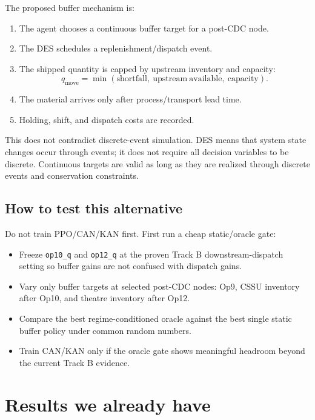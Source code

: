 \documentclass[11pt]{article}
\begin{document}
The proposed buffer mechanism is:

\begin{enumerate}[leftmargin=1.5em]
  \item The agent chooses a continuous buffer target for a post-CDC node.
  \item The DES schedules a replenishment/dispatch event.
  \item The shipped quantity is capped by upstream inventory and capacity:
  \[
    q_{\mathrm{move}} =
    \min(\mathrm{shortfall},\ \mathrm{upstream\ available},\ \mathrm{capacity}).
  \]
  \item The material arrives only after process/transport lead time.
  \item Holding, shift, and dispatch costs are recorded.
\end{enumerate}

This does not contradict discrete-event simulation. DES means that system state
changes occur through events; it does not require all decision variables to be
discrete. Continuous targets are valid as long as they are realized through
discrete events and conservation constraints.

\subsection*{How to test this alternative}

Do not train PPO/CAN/KAN first. First run a cheap static/oracle gate:

\begin{itemize}[leftmargin=1.5em]
  \item Freeze \texttt{op10\_q} and \texttt{op12\_q} at the proven Track B
  downstream-dispatch setting so buffer gains are not confused with dispatch
  gains.
  \item Vary only buffer targets at selected post-CDC nodes: Op9, CSSU inventory
  after Op10, and theatre inventory after Op12.
  \item Compare the best regime-conditioned oracle against the best single
  static buffer policy under common random numbers.
  \item Train CAN/KAN only if the oracle gate shows meaningful headroom beyond
  the current Track B evidence.
\end{itemize}

\section*{Results we already have}
\end{document}

